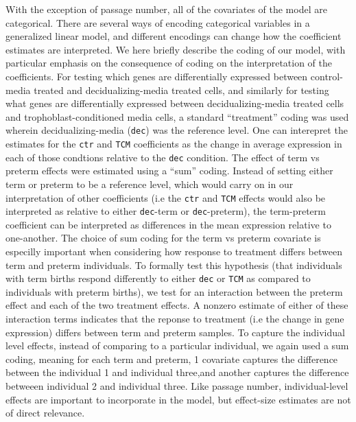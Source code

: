 With the exception of passage number, all of the covariates of the model are categorical. There are several ways of encoding categorical variables in a generalized linear model, and different encodings can change how the coefficient
estimates are interpreted. We here briefly describe the coding of our model, with particular emphasis on the consequence of coding on the interpretation of the coefficients.  For testing which genes are differentially expressed
between control-media treated and decidualizing-media treated cells, and similarly for testing what genes are differentially expressed between decidualizing-media treated cells and trophoblast-conditioned media cells, a standard
``treatment'' coding was used wherein decidualizing-media (\texttt{dec}) was the reference level.
One can interepret the estimates for the \texttt{ctr} and \texttt{TCM} coefficients as the change in average expression in each of those condtions relative to the \texttt{dec} condition.
The effect of term vs preterm effects were estimated using a ``sum'' coding. Instead of setting either term or preterm to be a reference level, which would carry on in our interpretation of other coefficients (i.e the \texttt{ctr} and \texttt{TCM} effects would also be interpreted as relative to either \texttt{dec}-term or \texttt{dec}-preterm), the term-preterm coefficient can be interpreted as differences in the mean expression relative to one-another.
The choice of sum coding for the term vs preterm covariate is especilly important when considering how response to treatment differs between term and preterm individuals.
To formally test this hypothesis (that individuals with term births respond differently to either \texttt{dec} or \texttt{TCM} as compared to individuals with preterm births), we test for an interaction between the preterm effect
and each of the two treatment effects.  A nonzero estimate of either of these interaction terms indicates that the reponse to treatment (i.e the change in gene expression) differs between term and preterm samples.
To capture the individual level effects, instead of comparing to a particular individual, we again used a sum coding, meaning for each term and preterm,  1 covariate captures the difference between the individual 1 and individual three,and another captures the difference betweeen individual 2 and individual three.
Like passage number, individual-level effects are important to incorporate in the model, but effect-size estimates are not of direct relevance.

